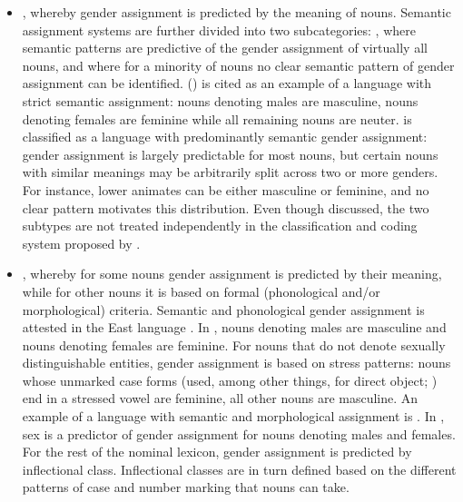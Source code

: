\documentclass[output=collectionpaper]{langsci/langscibook}
\begin{document}
\begin{itemize}
\item {}, whereby gender assignment is predicted by the meaning of nouns. Semantic assignment systems are further divided into two subcategories: , where semantic patterns are predictive of the gender assignment of virtually all nouns, and  where for a minority of nouns no clear semantic pattern of gender assignment can be identified.  () is cited as an example of a language with strict semantic assignment: nouns denoting males are masculine, nouns denoting females are feminine while all remaining nouns are neuter.  is classified as a language with predominantly semantic gender assignment: gender assignment is largely predictable for most nouns, but certain nouns with similar meanings may be arbitrarily split across two or more genders. For instance, lower animates can be either masculine or feminine, and no clear pattern motivates this distribution. Even though discussed, the two subtypes are not treated independently in the classification and coding system proposed by \cite{Corbett2013b}.
\item {}, whereby for some nouns gender assignment is predicted by their meaning, while for other nouns it is based on formal (phonological and/or morphological) criteria. Semantic and phonological gender assignment is attested in the East  language . In , nouns denoting males are masculine and nouns denoting females are feminine. For nouns that do not denote sexually distinguishable entities, gender assignment is based on stress patterns: nouns whose unmarked case forms (used, among other things, for direct object; \citealt[225]{Parker1985}) end in a stressed vowel are feminine, all other nouns are masculine. An example of a language with semantic and morphological assignment is . In , sex is a predictor of gender assignment for nouns denoting males and females. For the rest of the nominal lexicon, gender assignment is predicted by inflectional class. Inflectional classes are in turn defined based on the different patterns of case and number marking that nouns can take.
\end{itemize}
\end{document}
